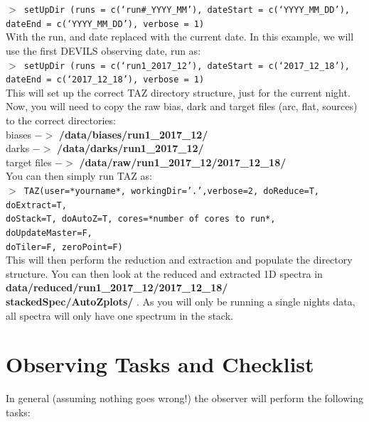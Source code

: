 \documentclass[12pt]{article}
\begin{document}
\texttt{$>$ setUpDir (runs = c(`run\#\_YYYY\_MM'), dateStart = c(`YYYY\_MM\_DD'), dateEnd = c(`YYYY\_MM\_DD'), verbose = 1)} \\

With the run, and date replaced with the current date. In this example, we will use the first DEVILS observing date, run as:\\

\texttt{$>$ setUpDir (runs = c(`run1\_2017\_12'), dateStart = c(`2017\_12\_18'), dateEnd = c(`2017\_12\_18'), verbose = 1)} \\

 This will set up the correct TAZ directory structure, just for the current night. Now, you will need to copy the raw bias, dark and target files (arc, flat, sources) to the correct directories:\\

biases $->$ \textbf{/data/biases/run1\_2017\_12/}\\
darks $->$ \textbf{/data/darks/run1\_2017\_12/}\\
target files $->$ \textbf{/data/raw/run1\_2017\_12/2017\_12\_18/}\\

You can then simply run TAZ as:\\

\texttt{$>$ TAZ(user=*yourname*, workingDir='.',verbose=2, doReduce=T, doExtract=T,  \\ doStack=T, doAutoZ=T, cores=*number of cores to run*, doUpdateMaster=F, \\ doTiler=F, zeroPoint=F)} \\

This will then perform the reduction and extraction and populate the directory structure. You can then look at the reduced and extracted 1D spectra in \textbf{data/reduced/run1\_2017\_12/2017\_12\_18/ \\ stackedSpec/AutoZplots/ }. As you will only be running a single nights data, all spectra will only have one spectrum in the stack. 


\section{Observing Tasks and Checklist}
\label{sec:summary}

In general (assuming nothing goes wrong!) the observer will perform the following tasks:\\
\end{document}
